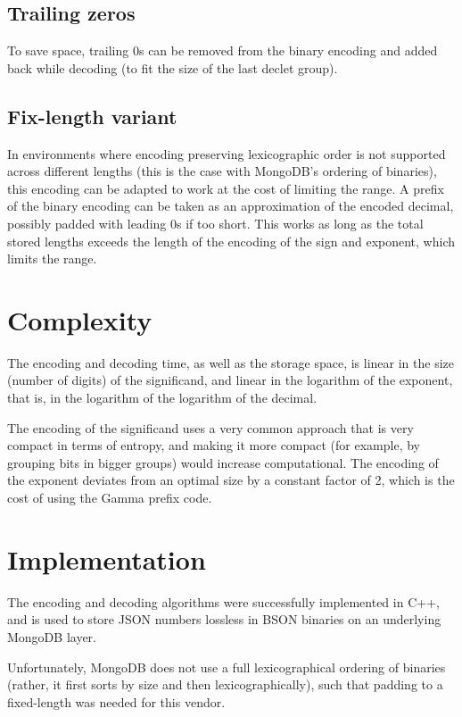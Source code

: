 \documentclass{acm_proc_article-sp}
\begin{document}
\subsection{Trailing zeros}

To save space, trailing 0s can be removed from the binary encoding and added back while decoding (to fit the size of the last declet group).

\subsection{Fix-length variant}

In environments where encoding preserving lexicographic order is not supported across different lengths (this is the case with MongoDB's ordering of binaries), this encoding can be adapted to work at the cost of limiting the range.
A prefix of the binary encoding can be taken as an approximation of the encoded decimal, possibly padded with leading 0s if too short. This works as long as the total stored lengths exceeds the length of the encoding of the sign and exponent, which limits the range.

\section{Complexity}
\label{section-complexity}
The encoding and decoding time, as well as the storage space, is linear in the size (number of digits) of the significand, and linear in the logarithm of the exponent, that is, in the logarithm of the logarithm of the decimal.

The encoding of the significand uses a very common approach that is very compact in terms of entropy, and making it more compact (for example, by grouping bits in bigger groups) would increase computational. The encoding of the exponent deviates from an optimal size by a constant factor of 2, which is the cost of using the Gamma prefix code.

\section{Implementation}

The encoding and decoding algorithms were successfully implemented in C++, and is used to store JSON numbers lossless in BSON binaries on an underlying MongoDB layer.

Unfortunately, MongoDB does not use a full lexicographical ordering of binaries (rather, it first sorts by size and then lexicographically), such that padding to a fixed-length was needed for this vendor.
\end{document}
